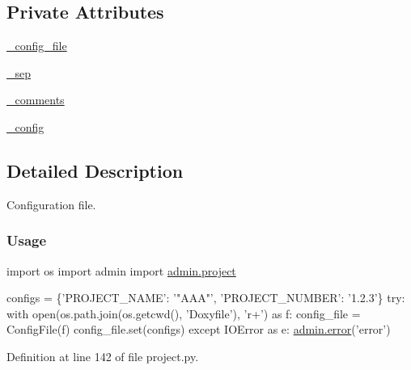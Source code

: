 \subsection*{Private Attributes}
\begin{DoxyCompactItemize}
\item 
\hyperlink{classadmin_1_1project_1_1ConfigFile_a56f108024b6f54bbaef0f880475a1d55}{\-\_\-config\-\_\-file}
\item 
\hyperlink{classadmin_1_1project_1_1ConfigFile_a905065a4ff208d6f2a716f04ec219be9}{\-\_\-sep}
\item 
\hyperlink{classadmin_1_1project_1_1ConfigFile_a8021e959e433fb88ef20c8e0706646a1}{\-\_\-comments}
\item 
\hyperlink{classadmin_1_1project_1_1ConfigFile_a3e9b17c49825647e05cdbcf536c8a3c3}{\-\_\-config}
\end{DoxyCompactItemize}


\subsection{Detailed Description}
Configuration file. 

\subsubsection*{Usage}


\begin{DoxyPre}{\ttfamily 
     import os
     import admin
     import \hyperlink{namespaceadmin_1_1project}{admin.project}}\end{DoxyPre}



\begin{DoxyPre}{\ttfamily      configs = \{'PROJECT\_NAME': '"AAA"',
           'PROJECT\_NUMBER': '1.2.3'\}
     try:
         with open(os.path.join(os.getcwd(), 'Doxyfile'), 'r+') as f:
             config\_file = ConfigFile(f)
             config\_file.set(configs)
         except IOError as e:
             \hyperlink{namespaceadmin_ae1e80d1a965f6551fa95ff379ba2b0cd}{admin.error}('error') 
}\end{DoxyPre}


Definition at line 142 of file project.\-py.



